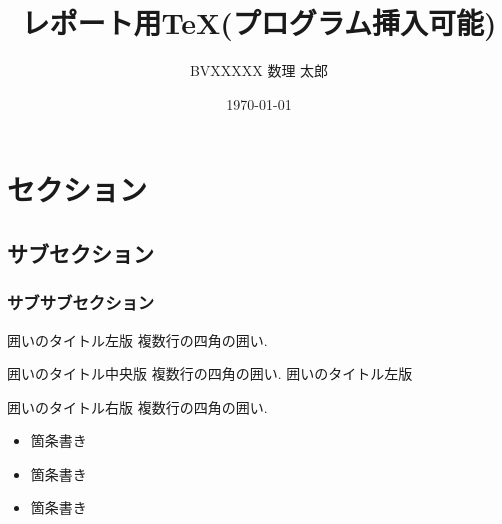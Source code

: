 \documentclass[titlepage, a4paper, 11pt, dvipdfmx]{jsarticle}
\title{\Huge レポート用TeX(プログラム挿入可能)}%
\date{\today}%
\author{\Large BVXXXXX \quad 数理 太郎}%
\begin{document}
\maketitle
{}
\tableofcontents%
\newpage
{}


\section{セクション}
\subsection{サブセクション}
\subsubsection{サブサブセクション}

\begin{itembox}[l]{囲いのタイトル左版}
複数行の四角の囲い.
\end{itembox}

\begin{itembox}[c]{囲いのタイトル中央版}
複数行の四角の囲い. 囲いのタイトル左版
\end{itembox}

\begin{itembox}[r]{囲いのタイトル右版}
複数行の四角の囲い.
\end{itembox}

\newpage

\begin{itemize}
\item 箇条書き
\item 箇条書き
\item 箇条書き
\end{itemize}
\end{document}
